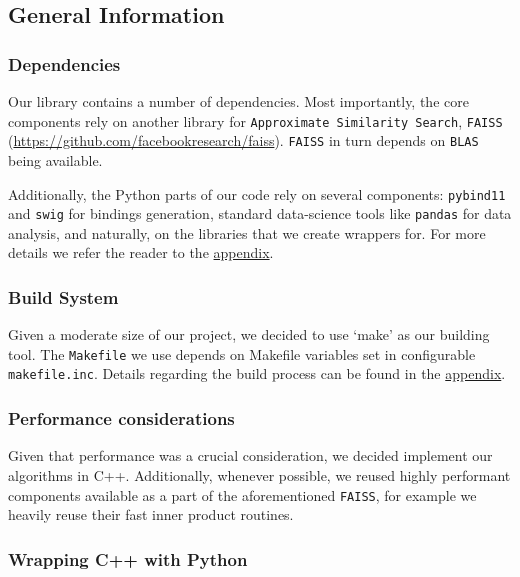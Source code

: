 
\subsection{General Information}

        
    \subsubsection{Dependencies}
    
        Our library contains a number of dependencies. Most importantly, the core components rely on 
        another library for \texttt{Approximate Similarity Search}, \texttt{FAISS} (\url{https://github.com/facebookresearch/faiss}).
        \texttt{FAISS} in turn depends on \texttt{BLAS} being available. 
        
        Additionally, the Python parts of our code rely on several components: \texttt{pybind11} and \texttt{swig}
        for bindings generation, standard data-science tools like \texttt{pandas} for data analysis, and naturally, on the 
        libraries that we create wrappers for. For more details we refer the reader to the \hyperref[sec:appendices]{appendix}.
    
    \subsubsection{Build System}
        
        Given a moderate size of our project, we decided to use `make' as our building tool. The \texttt{Makefile} we use
        depends on Makefile variables set in configurable \texttt{makefile.inc}. Details regarding the build process can be found in the \hyperref[sec:appendices]{appendix}.
        
    \subsubsection{Performance considerations}
        
        Given that performance was a crucial consideration, we decided implement our algorithms in C++.
        Additionally, whenever possible, we reused highly performant components available as a part of the aforementioned \texttt{FAISS}, 
        for example we heavily reuse their fast inner product routines. 
        
    \subsubsection{Wrapping C++ with Python}
        
